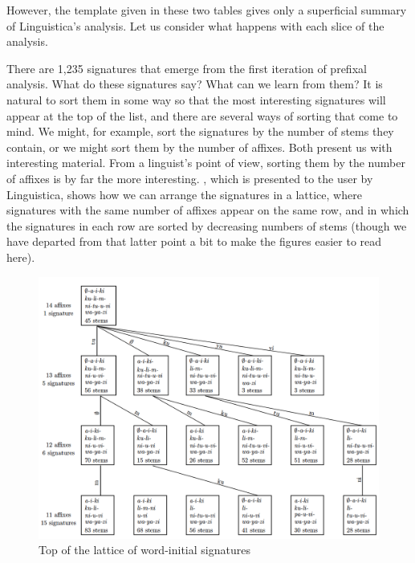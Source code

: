 \documentclass[output=paper,colorlinks,citecolor=brown]{langscibook}
\begin{document}
 
However, the template given in these two tables gives only a superficial summary of Linguistica's analysis. Let us consider what happens with each slice of the analysis.

 
There are 1,235 signatures that emerge from the first iteration of prefixal analysis. What do these signatures say? What can we learn from them? It is natural to sort them in some way so that the most interesting signatures will appear at the top of the list, and there are several ways of sorting that come to mind. We might, for example, sort the signatures by the number of stems they contain, or we might sort them by the number of affixes. Both present us with interesting material. From a linguist's point of view, sorting them by the number of affixes is by far the more interesting. , which is presented to the user by Linguistica, shows how we can arrange the signatures in a lattice, where signatures with the same number of affixes appear on the same row, and in which the signatures in each row are sorted by decreasing numbers of stems (though we have departed from that latter point a bit to make the figures easier to read here). 
 
\begin{figure}
\includegraphics[scale=0.7]{figures/top_of_lattice.png}
\caption{Top of the lattice of word-initial signatures}
\label{lattice}
\end{figure}

\end{document}

